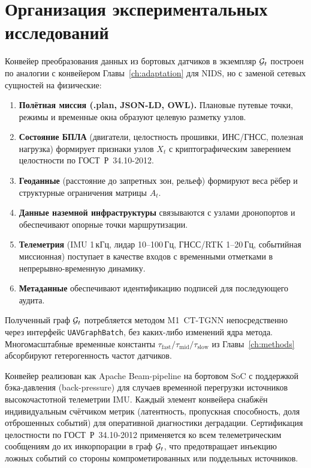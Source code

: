 \section{Организация экспериментальных исследований}
\label{sec:uav_pipeline}

Конвейер преобразования данных из бортовых датчиков в экземпляр
$\mathcal{G}_t$ построен по аналогии с конвейером Главы~\ref{ch:adaptation}
для NIDS, но с заменой сетевых сущностей на физические:

\begin{enumerate}\setlength\itemsep{0.15em}
\item \textbf{Полётная миссия (.plan, JSON-LD, OWL).} Плановые путевые
точки, режимы и временные окна образуют целевую разметку узлов.
\item \textbf{Состояние БПЛА} (двигатели, целостность прошивки,
ИНС/ГНСС, полезная нагрузка) формирует признаки узлов $X_t$ с
криптографическим заверением целостности по \mbox{ГОСТ~Р~34.10-2012}.
\item \textbf{Геоданные} (расстояние до запретных зон, рельеф)
формируют веса рёбер и структурные ограничения матрицы $A_t$.
\item \textbf{Данные наземной инфраструктуры} связываются с узлами
дронопортов и обеспечивают опорные точки маршрутизации.
\item \textbf{Телеметрия} (IMU 1\,кГц, лидар 10--100\,Гц, ГНСС/RTK
1--20\,Гц, событийная миссионная) поступает в качестве входов с
временными отметками в непрерывно-временную динамику.
\item \textbf{Метаданные} обеспечивают идентификацию подписей для
последующего аудита.
\end{enumerate}

Полученный граф $\mathcal{G}_t$ потребляется методом \textsf{M1~CT-TGNN}
непосредственно через интерфейс \texttt{UAVGraphBatch}, без
каких-либо изменений ядра метода. Многомасштабные временные константы
$\tau_{\mathrm{fast}}/\tau_{\mathrm{mid}}/\tau_{\mathrm{slow}}$ из
Главы~\ref{ch:methods} абсорбируют гетерогенность частот датчиков.

Конвейер реализован как Apache Beam-pipeline на бортовом SoC с
поддержкой бэка-давления (back-pressure) для случаев временной
перегрузки источников высокочастотной телеметрии IMU. Каждый
элемент конвейера снабжён индивидуальным счётчиком метрик
(латентность, пропускная способность, доля отброшенных событий)
для оперативной диагностики деградации. Сертификация целостности
по \mbox{ГОСТ~Р~34.10-2012} применяется ко всем телеметрическим
сообщениям до их инкорпорации в граф $\mathcal{G}_t$, что предотвращает
инъекцию ложных событий со стороны компрометированных или
поддельных источников.

